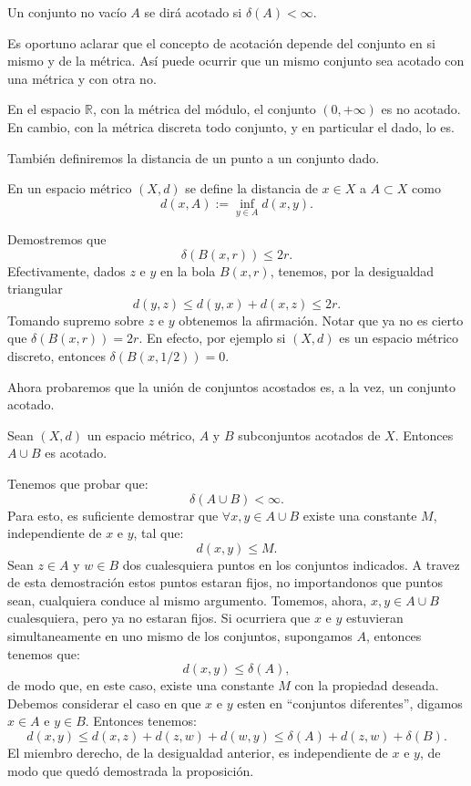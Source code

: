 \begin{definicion}{} Un conjunto no vacío $A$ se dirá acotado si
$\delta(A)<\infty$.
\end{definicion}
Es oportuno aclarar que el concepto de acotación depende del
conjunto en si mismo y de la métrica. Así puede ocurrir que
un mismo conjunto sea acotado con una métrica y con otra no.

\begin{ejemplo}{} En el espacio $\mathbb{R}$, con la métrica del
módulo, el conjunto $(0,+\infty)$ es no acotado. En cambio, con
la métrica discreta todo conjunto, y en particular el dado, lo
es.
\end{ejemplo}

También definiremos la distancia de un punto a un conjunto dado.

\begin{definicion}{} En un espacio métrico $(X,d)$ se define la
distancia de $x\in X$ a $A\subset X$ como
\[d(x,A):=\inf\limits_{y\in A}d(x,y).\]
\end{definicion}

Demostremos que
\[\delta(B(x,r))\leq 2r.\]
Efectivamente, dados $z$ e $y$ en la bola $B(x,r)$, tenemos, por
la desigualdad triangular
\[d(y,z)\leq d(y,x)+d(x,z)\leq 2r.\]
Tomando supremo sobre $z$ e $y$ obtenemos la afirmación. Notar
que ya no es cierto que $\delta(B(x,r))=2r$. En efecto, por
ejemplo si $(X,d)$ es un espacio métrico discreto, entonces
$\delta(B(x,1/2))=0$.

Ahora probaremos que la unión de conjuntos acostados es, a la
vez, un conjunto acotado.

\begin{proposicion}{} Sean $(X,d)$ un espacio métrico, $A$ y $B$
subconjuntos acotados de $X$. Entonces $A\cup B$ es acotado.
\end{proposicion}
\begin{demo}  Tenemos que probar que:
	\[\delta(A\cup B)<\infty.\]
Para esto, es suficiente demostrar que $\forall x,y\in A\cup B$
existe una constante $M$, independiente de $x$ e $y$, tal que:
\[d(x,y)\leq M.\]
Sean $z\in A$ y $w\in B$ dos cualesquiera puntos en los conjuntos
indicados. A travez de esta demostración estos puntos estaran
fijos, no importandonos que puntos sean, cualquiera conduce al
mismo argumento. Tomemos, ahora, $x,y\in A\cup B$ cualesquiera,
pero ya no estaran fijos. Si ocurriera que $x$ e $y$ estuvieran
simultaneamente en uno mismo de los conjuntos, supongamos $A$,
entonces tenemos que:
\[d(x,y)\leq \delta(A),\]
de modo que, en este caso, existe una constante $M$ con la
propiedad deseada. Debemos considerar el caso en que $x$ e $y$
esten en ``conjuntos diferentes'', digamos $x\in A$ e $y\in B$.
Entonces tenemos:
\[
	d(x,y)\leq d(x,z)+d(z,w)+d(w,y)\leq \delta(A)+d(z,w)+\delta(B).
\]
El miembro derecho, de la desigualdad anterior, es independiente
de $x$ e $y$, de modo que quedó demostrada la  proposición.
\end{demo}

